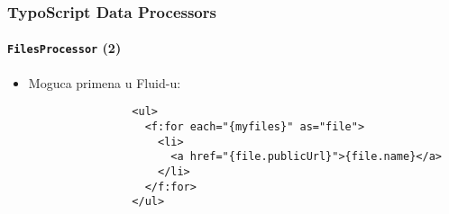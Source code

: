 \begin{frame}[fragile]
	\frametitle{TypoScript Data Processors}
	\framesubtitle{\texttt{FilesProcessor} (2)}

	\lstset{basicstyle=\tiny\ttfamily}

	\begin{itemize}

		\item Moguca primena u Fluid-u:

			\begin{lstlisting}
				<ul>
				  <f:for each="{myfiles}" as="file">
				    <li>
				      <a href="{file.publicUrl}">{file.name}</a>
				    </li>
				  </f:for>
				</ul>
			\end{lstlisting}

	\end{itemize}

\end{frame}


